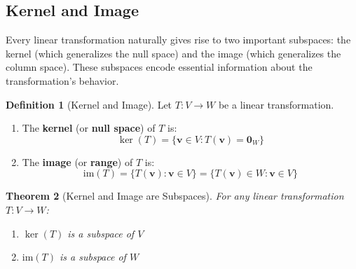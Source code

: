 \documentclass[12pt]{article}
\numberwithin{equation}{section}
\newcommand{\vect}[1]{\boldsymbol{#1}}   %
\theoremstyle{plain}
\newtheorem{theorem}{Theorem}[section]
\theoremstyle{definition}
\newtheorem{definition}[theorem]{Definition}
\theoremstyle{remark}
\begin{document}
\subsection{Kernel and Image}

Every linear transformation naturally gives rise to two important subspaces: the kernel (which generalizes the null space) and the image (which generalizes the column space). These subspaces encode essential information about the transformation's behavior.

\begin{definition}[Kernel and Image]
Let $T: V \to W$ be a linear transformation.
\begin{enumerate}
\item The \textbf{kernel} (or \textbf{null space}) of $T$ is:
$$\ker(T) = \{\vect{v} \in V : T(\vect{v}) = \vect{0}_W\}$$
\item The \textbf{image} (or \textbf{range}) of $T$ is:
$$\text{im}(T) = \{T(\vect{v}) : \vect{v} \in V\} = \{T(\vect{v}) \in W : \vect{v} \in V\}$$
\end{enumerate}
\end{definition}

\begin{theorem}[Kernel and Image are Subspaces]
For any linear transformation $T: V \to W$:
\begin{enumerate}
\item $\ker(T)$ is a subspace of $V$
\item $\text{im}(T)$ is a subspace of $W$
\end{enumerate}
\end{theorem}
\end{document}
